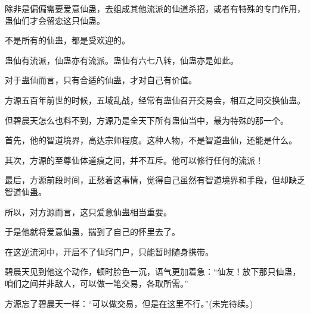 \begin{this_body}
除非是偏偏需要爱意仙蛊，去组成其他流派的仙道杀招，或者有特殊的专门作用，蛊仙们才会留恋这只仙蛊。

不是所有的仙蛊，都是受欢迎的。

蛊仙有流派，仙蛊亦有流派。蛊仙有六七八转，仙蛊亦是如此。

对于蛊仙而言，只有合适的仙蛊，才对自己有价值。

方源五百年前世的时候，五域乱战，经常有蛊仙召开交易会，相互之间交换仙蛊。

但碧晨天怎么也料不到，方源乃是全天下所有蛊仙当中，最为特殊的那一个。

首先，他的智道境界，高达宗师程度。这种人物，不是智道蛊仙，还能是什么。

其次，方源的至尊仙体道痕之间，并不互斥。他可以修行任何的流派！

最后，方源前段时间，正愁着这事情，觉得自己虽然有智道境界和手段，但却缺乏智道仙蛊。

所以，对方源而言，这只爱意仙蛊相当重要。

于是他就将爱意仙蛊，揣到了自己的怀里去了。

在这逆流河中，开启不了仙窍门户，只能暂时随身携带。

碧晨天见到他这个动作，顿时脸色一沉，语气更加着急：“仙友！放下那只仙蛊，咱们之间并非敌人，可以做一笔交易，各取所需。”

方源忘了碧晨天一样：“可以做交易，但是在这里不行。”(未完待续。)

\end{this_body}

